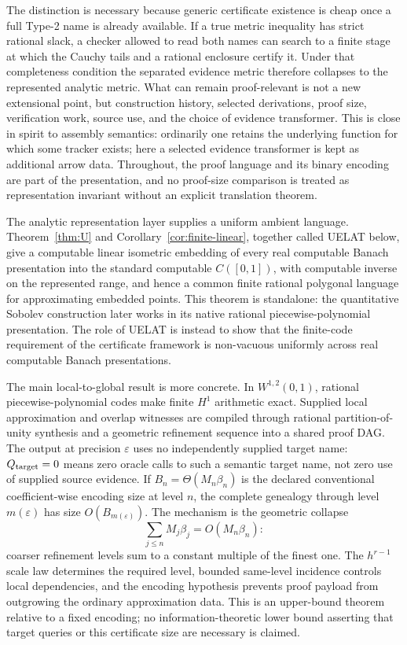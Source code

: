 \documentclass[11pt]{article}
\theoremstyle{definition}
\begin{document}
The distinction is necessary because generic certificate existence is cheap once a full
Type-2 name is already available.  If a true metric inequality has strict rational slack,
a checker allowed to read both names can search to a finite stage at which the Cauchy tails
and a rational enclosure certify it.  Under that completeness condition the separated
evidence metric therefore collapses to the represented analytic metric.  What can remain
proof-relevant is not a new extensional point, but construction history, selected
derivations, proof size, verification work, source use, and the choice of evidence
transformer.  This is close in spirit to assembly semantics: ordinarily one retains the
underlying function for which some tracker exists; here a selected evidence transformer is
kept as additional arrow data.  Throughout, the proof language and its binary encoding are
part of the presentation, and no proof-size comparison is treated as representation
invariant without an explicit translation theorem.

The analytic representation layer supplies a uniform ambient language.  Theorem~\ref{thm:U}
and Corollary~\ref{cor:finite-linear}, together called UELAT below, give a computable linear
isometric embedding of every real computable Banach presentation into the standard
computable $C([0,1])$, with computable inverse on the represented range, and hence a common
finite rational polygonal language for approximating embedded points.  This theorem is
standalone: the quantitative Sobolev construction later works in its native rational
piecewise-polynomial presentation.  The role of UELAT is instead to show that the finite-code
requirement of the certificate framework is non-vacuous uniformly across real computable
Banach presentations.

The main local-to-global result is more concrete.  In $W^{1,2}(0,1)$, rational
piecewise-polynomial codes make finite $H^1$ arithmetic exact.  Supplied local approximation
and overlap witnesses are compiled through rational partition-of-unity synthesis and a
geometric refinement sequence into a shared proof DAG.  The output at precision
$\varepsilon$ uses no independently supplied target name: $Q_{\rm target}=0$ means zero
oracle calls to such a semantic target name, not zero use of supplied source evidence.
If $B_n=\Theta(M_n\beta_n)$ is the declared conventional coefficient-wise encoding size at
level $n$, the complete genealogy through level $m(\varepsilon)$ has size
$O(B_{m(\varepsilon)})$.  The mechanism is the geometric collapse
\[
 \sum_{j\le n}M_j\beta_j=O(M_n\beta_n):
\]
coarser refinement levels sum to a constant multiple of the finest one.  The
$h^{r-1}$ scale law determines the required level, bounded same-level incidence controls
local dependencies, and the encoding hypothesis prevents proof payload from outgrowing the
ordinary approximation data.  This is an upper-bound theorem relative to a fixed encoding;
no information-theoretic lower bound asserting that target queries or this certificate size
are necessary is claimed.
\end{document}
